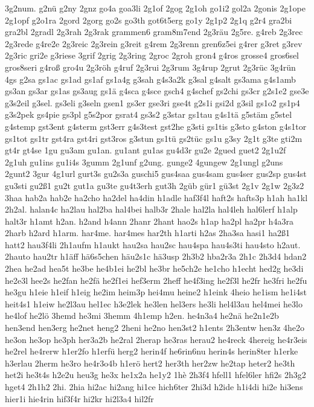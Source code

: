 {3g2num.
g2nü
g2ny
2gnz
go4a
goa3li
2g1of
2gog
2g1oh
go1i2
gol2a
2gonis
2g1ope
2g1opf
g2o1ra
2gord
2gorg
go2s
go3th
got6t5erg
go1y
2g1p2
2g1q
g2r4
gra2bi
gra2bl
2gradl
2g3rah
2g3rak
grammen6
gram8m7end
2g3räu
2g5re.
g4reb
2g3rec
2g3rede
g4re2e
2g3reic
2g3rein
g3reit
g4rem
2g3renn
gren6z5ei
g4rer
g3ret
g3rev
2g3ric
gri2e
g3riese
3grif
2grig
2g3ring
2groc
2groh
gron4
g4ros
grosse4
gros6sel
gros8seri
g4roß
gro4u
2g3röh
g4ruf
2g3rui
2g3rum
3g4rup
2grut
2g3rüc
3g4rün
4gs
g2sa
gs1ac
gs1ad
gs1af
gs1a4g
g3sah
g4s3a2k
g3sal
g4salt
gs3ama
g4s1amb
gs3an
gs3ar
gs1as
gs3aug
gs1ä
g4sca
g4sce
gsch4
g4schef
gs2chi
gs3cr
g2s1e2
gse3e
g3s2eil
g3sel.
gs3eli
g3seln
gsen1
gs3er
gse3ri
gse4t
g2s1i
gsi2d
g3sil
gs1o2
gs1p4
g3s2pek
gs4pie
gs3pl
g5s2por
gsrat4
gs3s2
g3star
gs1tau
g4s1tä
g5stäm
g5stel
g4stemp
gst3ent
g4sterm
gst3err
g4s3test
gst2he
g3sti
gs1tis
g3sto
g4ston
g4s1tor
gs1tot
gs1tr
gst4ra
gst4ri
gst3ros
g3stun
gs1tü
gs2tüc
gs1u
g3sy
2g1t
g3te
gti2m
gt4r
gt4se
1gu
gu3am
gu1an.
gu1ant
gu1as
gu4d3r
gu2e
2gued
guet2
2g1u2f
2g1uh
gu1ins
gu1i4s
3gumm
2g1unf
g2ung.
gunge2
4gungew
2g1ungl
g2uns
2gunt2
3gur
4g1url
gurt3s
gu2s3a
guschi5
gus4saa
gus4sam
gus4ser
gus2sp
gus4st
gu3sti
gu2ß1
gu2t
gut1a
gu3te
gu4t3erh
gut3h
2güb
gür1
gü3st
2g1v
2g1w
2g3z2
3haa
hab2a
hab2e
ha2cho
ha2del
ha4din
h1adle
haf3f4l
haft2s
hafts3p
h1ah
ha1kl
2h2al.
halan4c
ha2lau
hal2ba
hal4bei
halb3r
2hale
hal2la
hal4leh
hal6lerf
h1alp
halt3r
h1amt
h2an.
h2and
h4ann
2hanr
2hant
hao2s
h1ap
ha2pl
ha2pr
h4a3ra
2harb
h2ard
h1arm.
har4me.
har4mes
har2th
h1arti
h2as
2ha3sa
hasi1
ha2ß1
hatt2
hau3f4li
2h1aufm
h1aukt
hau2sa
hau2sc
hau4spa
hau4s3ti
hau4sto
h2aut.
2hauto
hau2tr
h1äff
hä6s5chen
häu2s1c
hä3usp
2h3b2
hba2r3a
2h1c
2h3d4
hdan2
2hea
he2ad
hea5t
he3be
he4b1ei
he2bl
he3br
he5ch2e
he1cho
h1echt
hed2g
he3di
he2e3l
hee2s
he2fan
he2fä
he2f1ei
hef3erm
2heff
he4f3ing
he2f3l
he2fr
he3fri
he2fu
he3gu
h1eie
h1eif
h1eig
he2im
heim3p
hei4mu
heine2
h1eink
4heio
he1ism
he1i4st
heit4s1
h1eiw
he2l3au
hel1ec
h3e2lek
he3len
hel3ers
he3li
hel4l3au
hel4mei
he3lo
he4lof
he2lö
3hemd
he3mi
3hemm
4h1emp
h2en.
he4n3a4
he2nä
he2n1e2b
hen3end
hen3erg
he2net
heng2
2heni
he2no
hen3st2
h1ents
2h3entw
hen3z
4he2o
he3on
he3op
he3ph
her3a2b
he2ral
2herap
he3ras
herau2
he4reck
4hereig
he4r3eis
he2rel
he4rerw
h1er2fo
h1erfü
herg2
herin4f
he6rin6nu
herin4s
herin8ter
h1erke
h3erlau
2herm
he3ro
he4r3o4b
h1erö
hert2
her3th
her2zw
he2tap
heter2
he3th
het2i
he3t4s
h2e2u
heu3g
he3x
he1x2a
he1y2
1hè
2h3f4
hfell1
hfel6ler
hfi2s
2h3g2
hget4
2h1h2
2hi.
2hia
hi2ac
hi2ang
hi1ce
hich6ter
2hi3d
h2ide
h1i4di
hi2e
hi3ens
hier1i
hie4rin
hif3f4r
hi2kr
hi2l3a4
hil2fr
}
